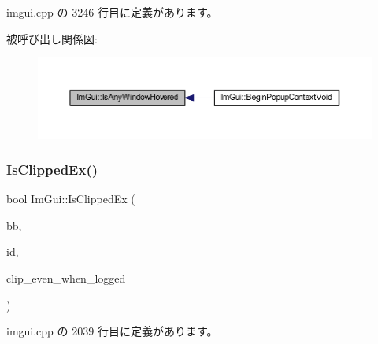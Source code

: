  imgui.\+cpp の 3246 行目に定義があります。

被呼び出し関係図\+:\nopagebreak
\begin{figure}[H]
\begin{center}
\leavevmode
\includegraphics[width=350pt]{namespace_im_gui_a62379e94283e247288c9a6c15a2b797e_icgraph}
\end{center}
\end{figure}
\mbox{\label{namespace_im_gui_a8674467ae34d04bc99df1f7f98f47407}} 
\subsubsection{\texorpdfstring{Is\+Clipped\+Ex()}{IsClippedEx()}}
{\footnotesize\ttfamily bool Im\+Gui\+::\+Is\+Clipped\+Ex (\begin{DoxyParamCaption}\item[{const \mbox{\hyperlink{struct_im_rect}{Im\+Rect}} \&}]{bb,  }\item[{\mbox{\hyperlink{imgui_8h_a1785c9b6f4e16406764a85f32582236f}{Im\+Gui\+ID}}}]{id,  }\item[{bool}]{clip\+\_\+even\+\_\+when\+\_\+logged }\end{DoxyParamCaption})}



 imgui.\+cpp の 2039 行目に定義があります。

